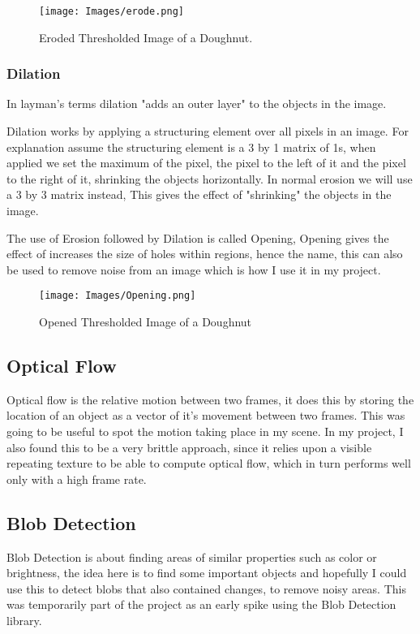 \documentclass[a4paper]{report}
\begin{document}
\begin{figure}[!ht]
\centering
\texttt{[image: Images/erode.png]}
\caption{\label{fig:Doughnut} Eroded Thresholded Image of a Doughnut.}
\end{figure}

\subsubsection{Dilation}
In layman's terms dilation "adds an outer layer" to the objects in the image.

Dilation works by applying a structuring element over all pixels in an image. For explanation assume the structuring element is a 3 by 1 matrix of 1s, when applied we set the maximum of the pixel, the pixel to the left of it and the pixel to the right of it, shrinking the objects horizontally. In normal erosion we will use a 3 by 3 matrix instead, This gives the effect of "shrinking" the objects in the image.

The use of Erosion followed by Dilation is called Opening, Opening gives the effect of increases the size of holes within regions, hence the name, this can also be used to remove noise from an image which is how I use it in my project.

\begin{figure}[!ht]
\centering
\texttt{[image: Images/Opening.png]}
\caption{\label{fig:Doughnut} Opened Thresholded Image of a Doughnut}
\end{figure}
\clearpage
\subsection{Optical Flow}
Optical flow is the relative motion between two frames, it does this by storing the location of an object as a vector of it's movement between two frames. This was going to be useful to spot the motion taking place in my scene. In my project, I also found this to be a very brittle approach, since it relies upon a visible repeating texture to be able to compute optical flow, which in turn performs well only with a high frame rate.

\subsection{Blob Detection}
Blob Detection is about finding areas of similar properties such as color or brightness, the idea here is to find some important objects and hopefully I could use this to detect blobs that also contained changes, to remove noisy areas. This was temporarily part of the project as an early spike using the Blob Detection library\cite{BLOB}.
\end{document}
